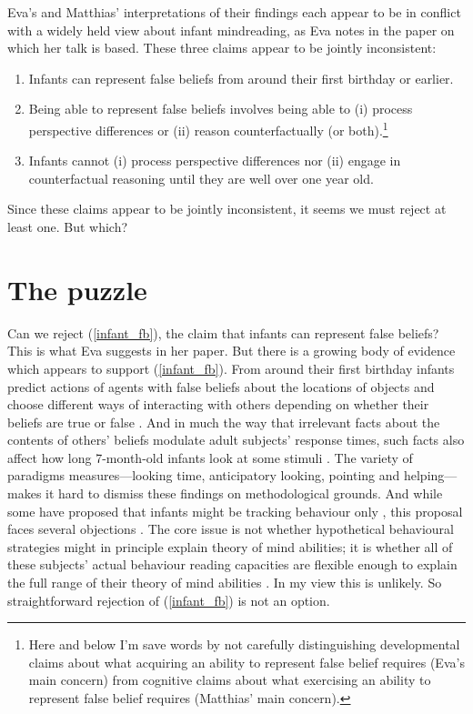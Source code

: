 \documentclass[12pt,\papersize]{extarticle}
\begin{document}
Eva's and Matthias' interpretations of their findings each appear to be in conflict with 
 a widely held view about infant mindreading, 
  as Eva notes in the paper on which her talk is based.
These three claims appear to be jointly inconsistent:
%
\begin{enumerate}
\item Infants can represent false beliefs from around their first birthday or earlier. \label{infant_fb}

\item  \label{fb_is_perspectives}  Being able to represent false beliefs involves being able to  (i) process perspective differences or (ii) reason counterfactually (or both).\footnote{
Here and below I'm save words by not carefully distinguishing 
 developmental claims about what acquiring an ability to represent false belief requires (Eva's main concern)
 from
 cognitive claims about what exercising an ability to represent false belief requires (Matthias' main concern).
}

\item Infants cannot (i) process perspective differences nor (ii) engage in counterfactual reasoning until they are well over one year old.  \label{infant_perspectives}

\end{enumerate}
%
Since these claims appear to be jointly inconsistent, it seems we must reject at least one.  But which?


\section{The puzzle}
Can we reject (\ref{infant_fb}), the claim that infants can represent false beliefs?  
This is what  Eva suggests in her paper.
But there is a growing body of evidence which appears to support  (\ref{infant_fb}).
From around their first birthday infants  predict actions of agents with false beliefs about the locations of objects \citep[]{en_1092, en_1208} and choose different ways of interacting with others depending on whether their beliefs are true or false \citep[]{en_1783,Knudsen:2011fk,southgate:2010fb}.  
And in much the way that irrelevant facts about the contents of others’ beliefs modulate adult subjects’ response times, such facts also affect how long 7-month-old infants look at some stimuli \citep[]{en_1821}.
The variety of paradigms measures---looking time, anticipatory looking, pointing and helping---makes it hard to dismiss these findings on methodological grounds.
And while some have proposed that infants might be tracking behaviour only \citet{en_1168, en_1169},
this proposal faces several objections \citep[e.g.][]{Song:2008qo}.
The core issue is not whether hypothetical behavioural strategies might in principle explain theory of mind abilities; it is whether all of these subjects’ actual behaviour reading capacities are flexible enough to explain the full range of their theory of mind abilities \citep[]{Apperly:2009ju}.
In my view this is unlikely.
So straightforward rejection of  (\ref{infant_fb}) is not an option.
\end{document}
